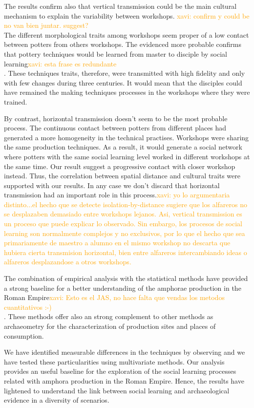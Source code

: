 \documentclass[review]{elsarticle}
\newcommand{\memo}[2]{\textcolor{#1}{#2}}
\newcommand{\xavi}[1]{\memo{orange}{xavi: #1\\}}
\begin{document}
The results confirm also that vertical transmission could be the main cultural mechanism to explain the variability between workshops. \xavi{confirm y could be no van bien juntar. suggest? }The different morphological traits among workshops seem proper of a low contact between potters from others workshops. The evidenced more probable confirms that pottery techniques would be learned from master to disciple by social learning\xavi{esta frase es redundante}. These techniques traits, therefore, were transmitted with high fidelity and only with few changes during three centuries. It would mean that the disciples could have remained the making techniques processes in the workshops where they were trained.  

By contrast, horizontal transmission doesn't seem to be the most probable process. The continuous contact between potters from different places had generated a more homogeneity in the technical practises. Workshops were sharing the same production techniques. As a result, it would generate a social network where potters with the same social learning level worked in different workshops at the same time. Our result suggest a progressive contact with closer workshop instead. Thus, the correlation between spatial distance and cultural traits were supported with our results. In any case we don't discard that horizontal transmission had an important role in this process.\xavi{yo lo argumentaria distinto...el hecho que se detecte isolation-by-distance sugiere que los alfareros no se desplazaben demasiado entre workshops lejanos. Asi, vertical transmission es un proceso que puede explicar lo observado. Sin embargo, los procesos de social learning son normalmente complejos y no exclusivos, por lo que el hecho que sea primariamente de maestro a alumno en el mismo workshop no descarta que hubiera cierta transmision horizontal, bien entre alfareros intercambiando ideas o alfareros desplazandose a otros workshops.}

The combination of empirical analysis with the statistical methods have provided a strong baseline for a better understanding of the amphorae production in the Roman Empire\xavi{Esto es el JAS, no hace falta que vendas los metodos cuantitativos :-)}. These methods offer also an strong complement to other methods as archaeometry for the characterization of production sites and places of consumption.  

We have identified measurable differences in the techniques by observing and we have tested these particularities using multivariate methods. Our analysis provides an useful baseline for the exploration of the social learning processes related with amphora production in the Roman Empire. Hence, the results have lightened to understand the link between social learning and archaeological evidence in a diversity of scenarios. 
\end{document}
